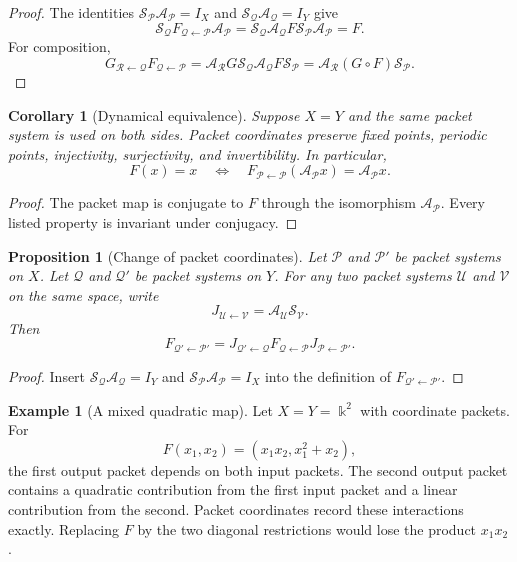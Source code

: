 \documentclass{aomart}
\newtheorem{proposition}[proposition]{Proposition}
\newtheorem{corollary}[corollary]{Corollary}
\theoremstyle{definition}
\newtheorem{example}[example]{Example}
\theoremstyle{remark}
\newcommand{\bbk}{\Bbbk}
\newcommand{\Acal}{\mathcal A}
\newcommand{\Pcal}{\mathcal P}
\newcommand{\Qcal}{\mathcal Q}
\newcommand{\Rcal}{\mathcal R}
\newcommand{\Scal}{\mathcal S}
\newcommand{\Ucal}{\mathcal U}
\newcommand{\Vcal}{\mathcal V}
\begin{document}
\begin{proof}
The identities $\Scal_{\Pcal}\Acal_{\Pcal}=I_X$ and $\Scal_{\Qcal}\Acal_{\Qcal}=I_Y$ give
\[
\Scal_{\Qcal}F_{\Qcal\leftarrow\Pcal}\Acal_{\Pcal}
=
\Scal_{\Qcal}\Acal_{\Qcal}F\Scal_{\Pcal}\Acal_{\Pcal}
=F.
\]
For composition,
\[
G_{\Rcal\leftarrow\Qcal}F_{\Qcal\leftarrow\Pcal}
=
\Acal_{\Rcal}G\Scal_{\Qcal}\Acal_{\Qcal}F\Scal_{\Pcal}
=
\Acal_{\Rcal}(G\circ F)\Scal_{\Pcal}.
\]
\end{proof}

\begin{corollary}[Dynamical equivalence]\label{cor:dynamical_equivalence}
Suppose $X=Y$ and the same packet system is used on both sides.  Packet coordinates preserve fixed points, periodic points, injectivity, surjectivity, and invertibility.  In particular,
\[
F(x)=x
\quad\Longleftrightarrow\quad
F_{\Pcal\leftarrow\Pcal}(\Acal_{\Pcal}x)=\Acal_{\Pcal}x.
\]
\end{corollary}

\begin{proof}
The packet map is conjugate to $F$ through the isomorphism $\Acal_{\Pcal}$.  Every listed property is invariant under conjugacy.
\end{proof}

\begin{proposition}[Change of packet coordinates]\label{prop:change_packet_coordinates}
Let $\Pcal$ and $\Pcal'$ be packet systems on $X$.  Let $\Qcal$ and $\Qcal'$ be packet systems on $Y$.  For any two packet systems $\Ucal$ and $\Vcal$ on the same space, write
\[
J_{\Ucal\leftarrow\Vcal}
=
\Acal_{\Ucal}\Scal_{\Vcal}.
\]
Then
\[
F_{\Qcal'\leftarrow\Pcal'}
=
J_{\Qcal'\leftarrow\Qcal}
F_{\Qcal\leftarrow\Pcal}
J_{\Pcal\leftarrow\Pcal'}.
\]
\end{proposition}

\begin{proof}
Insert $\Scal_{\Qcal}\Acal_{\Qcal}=I_Y$ and $\Scal_{\Pcal}\Acal_{\Pcal}=I_X$ into the definition of $F_{\Qcal'\leftarrow\Pcal'}$.
\end{proof}

\begin{example}[A mixed quadratic map]\label{ex:mixed_quadratic}
Let $X=Y=\bbk^2$ with coordinate packets.  For
\[
F(x_1,x_2)=(x_1x_2,x_1^2+x_2),
\]
the first output packet depends on both input packets.  The second output packet contains a quadratic contribution from the first input packet and a linear contribution from the second.  Packet coordinates record these interactions exactly.  Replacing $F$ by the two diagonal restrictions would lose the product $x_1x_2$.
\end{example}
\end{document}

